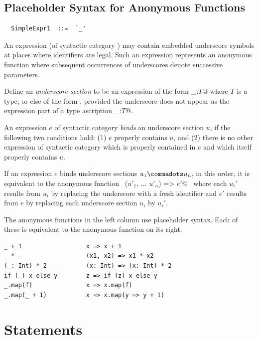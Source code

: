 \subsection*{Placeholder Syntax for Anonymous Functions}\label{sec:impl-anon-fun}

\syntax\begin{lstlisting}
  SimpleExpr1  ::=  `_'
\end{lstlisting}

An expression (of syntactic category \lstinline@Expr@)
may contain embedded underscore symbols \code{_} at places where identifiers
are legal. Such an expression represents an anonymous function where subsequent
occurrences of underscores denote successive parameters.

Define an {\em underscore section} to be an expression of the form
\lstinline@_:$T$@ where $T$ is a type, or else of the form \code{_},
provided the underscore does not appear as the expression part of a
type ascription \lstinline@_:$T$@.

An expression $e$ of syntactic category  {\em binds} an underscore section
$u$, if the following two conditions hold: (1) $e$ properly contains $u$, and
(2) there is no other expression of syntactic category  
which is properly contained in $e$ and which itself properly contains $u$.

If an expression $e$ binds underscore sections $u_1 \commadots u_n$, in this order, it is equivalent to 
the anonymous function ~\lstinline@($u'_1$, ... $u'_n$) => $e'$@~
where each $u_i'$ results from $u_i$ by replacing the underscore with a fresh identifier and
$e'$ results from $e$ by replacing each underscore section $u_i$ by $u_i'$.

\example The anonymous functions in the left column use placeholder
syntax. Each of these is equivalent to the anonymous function on its right.

\begin{lstlisting}
_ + 1                  x => x + 1
_ * _                  (x1, x2) => x1 * x2
(_: Int) * 2           (x: Int) => (x: Int) * 2
if (_) x else y        z => if (z) x else y
_.map(f)               x => x.map(f)
_.map(_ + 1)           x => x.map(y => y + 1)
\end{lstlisting}

\section{Statements}
\label{sec:statements}

